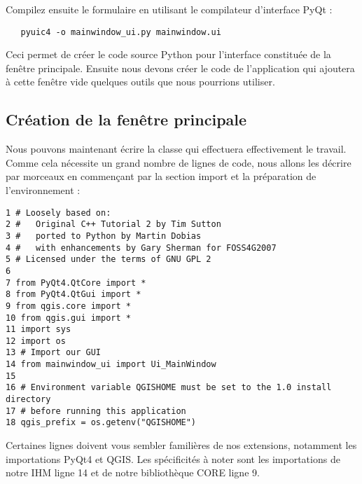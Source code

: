 Compilez ensuite le formulaire en utilisant le compilateur d'interface PyQt :

\begin{verbatim}
   pyuic4 -o mainwindow_ui.py mainwindow.ui
\end{verbatim}

Ceci permet de cr\'eer le code source Python pour l'interface constitu\'ee de la fen\^etre principale. Ensuite nous devons cr\'eer le code de l'application qui ajoutera \`a cette fen\^etre vide quelques outils que nous pourrions utiliser.

\subsection{Cr\'eation de la fen\^etre principale}

Nous pouvons maintenant \'ecrire la classe  qui effectuera effectivement le travail.
Comme cela n\'ecessite un grand nombre de lignes de code, nous allons les d\'ecrire par morceaux en commen\c{c}ant par la section import et la pr\'eparation de l'environnement :

\begin{verbatim}
1 # Loosely based on:
2 #   Original C++ Tutorial 2 by Tim Sutton
3 #   ported to Python by Martin Dobias
4 #   with enhancements by Gary Sherman for FOSS4G2007
5 # Licensed under the terms of GNU GPL 2
6
7 from PyQt4.QtCore import *
8 from PyQt4.QtGui import *
9 from qgis.core import *
10 from qgis.gui import *
11 import sys
12 import os
13 # Import our GUI
14 from mainwindow_ui import Ui_MainWindow
15 
16 # Environment variable QGISHOME must be set to the 1.0 install directory
17 # before running this application
18 qgis_prefix = os.getenv("QGISHOME")
\end{verbatim}

Certaines lignes doivent vous sembler famili\`eres de nos extensions, notamment les importations PyQt4 et QGIS. Les sp\'ecificit\'es \`a noter sont les importations de notre IHM ligne 14 et de notre biblioth\`eque CORE ligne 9.


